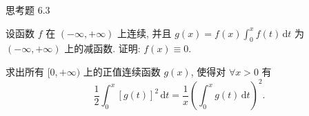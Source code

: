 \begin{exblock}{思考题 6.3}

  \item 设函数 $f$ 在 $(-\infty,+\infty)$ 上连续, 并且 $g(x)=f(x)\int_{0}^{x}f(t)\,\mathrm{d}t$ 为 $(-\infty,+\infty)$ 上的减函数. 证明: $f(x)\equiv 0$.

  \item 求出所有 $[0,+\infty)$ 上的正值连续函数 $g(x)$, 使得对 $\forall x>0$ 有
  \[
  \frac{1}{2}\int_{0}^{x}[g(t)]^{2}\,\mathrm{d}t=\frac{1}{x}\left(\int_{0}^{x}g(t)\,\mathrm{d}t\right)^{2}.
\]
\end{exblock}
